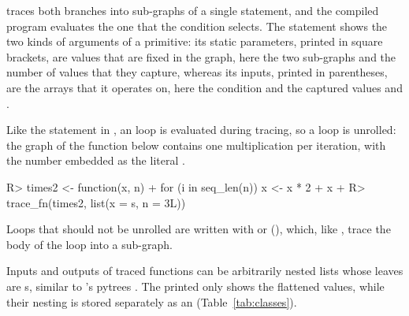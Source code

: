 \documentclass[article,shortnames]{jss}
\renewenvironment{CodeChunk}{\par\addvspace{0.6\baselineskip}\noindent\begin{minipage}{\linewidth}}{\end{minipage}\par\vspace{0.6\baselineskip}}
\begin{document}
 traces both branches into sub-graphs of a single  statement, and the compiled program evaluates the one that the condition selects.
The statement shows the two kinds of arguments of a primitive: its static parameters, printed in square brackets, are  values that are fixed in the graph, here the two sub-graphs and the number of values that they capture, whereas its inputs, printed in parentheses, are the arrays that it operates on, here the condition  and the captured values  and .

Like the  statement in , an  loop is evaluated during tracing, so a  loop is unrolled: the graph of the function below contains one multiplication per iteration, with the  number  embedded as the literal .

\begin{CodeChunk}
\begin{CodeInput}
R> times2 <- function(x, n) {
+    for (i in seq_len(n)) x <- x * 2
+    x
+  }
R> trace_fn(times2, list(x = s, n = 3L))
\end{CodeInput}
\end{CodeChunk}

Loops that should not be unrolled are written with  or  (), which, like , trace the body of the loop into a sub-graph.

Inputs and outputs of traced functions can be arbitrarily nested lists whose leaves are s, similar to 's pytrees \citep{ref-jax}.
The printed  only shows the flattened values, while their nesting is stored separately as an  (Table~\ref{tab:classes}).
\end{document}
